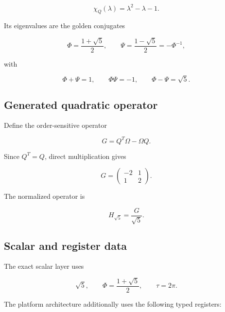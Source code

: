\documentclass[11pt,letterpaper]{article}
\theoremstyle{clearonyx}
\begin{document}
\begin{equation}
\chi_Q(\lambda)=\lambda^2-\lambda-1.
\end{equation}

Its eigenvalues are the golden conjugates

\begin{equation}
\Phi=\frac{1+\sqrt5}{2},
\qquad
\Psi=\frac{1-\sqrt5}{2}=-\Phi^{-1},
\end{equation}

with

\begin{equation}
\Phi+\Psi=1,
\qquad
\Phi\Psi=-1,
\qquad
\Phi-\Psi=\sqrt5.
\end{equation}

\subsection{Generated quadratic operator}

Define the order-sensitive operator

\begin{equation}
G=Q^{T}\Omega-\Omega Q.
\end{equation}

Since $Q^T=Q$, direct multiplication gives

\begin{equation}
G=
\begin{pmatrix}
-2&1\\
1&2
\end{pmatrix}.
\end{equation}

The normalized operator is

\begin{equation}
H_{\sqrt5}=\frac{G}{\sqrt5}.
\end{equation}

\subsection{Scalar and register data}

The exact scalar layer uses

\begin{equation}
\sqrt5,
\qquad
\Phi=\frac{1+\sqrt5}{2},
\qquad
\tau=2\pi.
\end{equation}

The platform architecture additionally uses the following typed registers:
\end{document}
